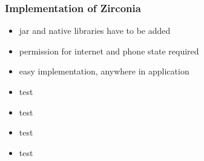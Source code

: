 \subsubsection{Implementation of Zirconia} \label{section:license-samsung-implementation}
\begin{itemize}
  \item jar and native libraries have to be added
  \item permission for internet and phone state required
  \item easy implementation, anywhere in application
  \item test
  \item test
  \item test
  \item test
\end{itemize}




